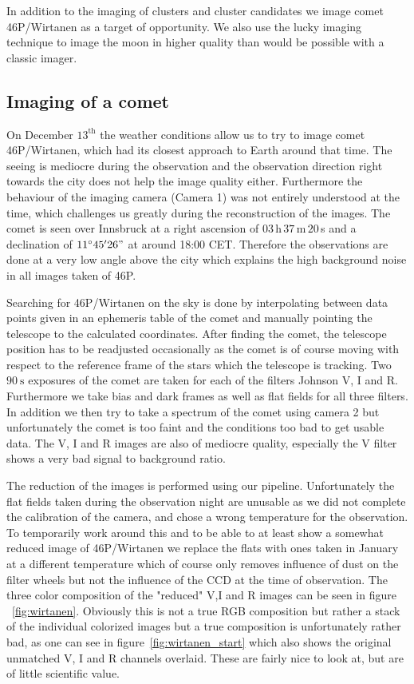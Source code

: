 \documentclass{article}
\begin{document}
In addition to the imaging of clusters and cluster candidates we image comet 46P/Wirtanen as a target of opportunity. We also use the lucky imaging technique to image the moon in higher quality than would be possible with a classic imager.

\subsection{Imaging of a comet}

On December $13^\text{th}$ the weather conditions allow us to try to image comet 46P/Wirtanen, which had its closest approach to Earth around that time. The seeing is mediocre during the observation and the observation direction right towards the city does not help the image quality either. Furthermore the behaviour of the imaging camera (Camera 1) was not entirely understood at the time, which challenges us greatly during the reconstruction of the images.
The comet is seen over Innsbruck at a right ascension of $\num{03}\,$h$\,\num{37}\,$m$\,\num{20}\,$s and a declination of $\SI{11}{\degree} \num{45}'\num{26}"$ at around 18:00 CET. Therefore the observations are done at a very low angle above the city which explains the high background noise in all images taken of 46P.

Searching for 46P/Wirtanen on the sky is done by interpolating between data points given in an ephemeris table \parencite{wirtanen} of the comet and manually pointing the telescope to the calculated coordinates. After finding the comet, the telescope position has to be readjusted occasionally as the comet is of course moving with respect to the reference frame of the stars which the telescope is tracking. Two $\SI{90}{\second}$ exposures of the comet are taken for each of the filters Johnson V, I and R. Furthermore we take bias and dark frames as well as flat fields for all three filters. In addition we then try to take a spectrum of the comet using camera 2 but unfortunately the comet is too faint and the conditions too bad to get usable data. The V, I and R images are also of mediocre quality, especially the V filter shows a very bad signal to background ratio. 

The reduction of the images is performed using our pipeline. Unfortunately the flat fields taken during the observation night are unusable as we did not complete the calibration of the camera, and chose a wrong temperature for the observation. To temporarily work around this and to be able to at least show a somewhat reduced image of 46P/Wirtanen we replace the flats with ones taken in January at a different temperature which of course only removes influence of dust on the filter wheels but not the influence of the CCD at the time of observation. The three color composition of the "reduced" V,I and R images can be seen in figure ~\ref{fig:wirtanen}. Obviously this is not a true RGB composition but rather a stack of the individual colorized images but a true composition is unfortunately rather bad, as one can see in figure~\ref{fig:wirtanen_start} which also shows the original unmatched V, I and R channels overlaid. These are fairly nice to look at, but are of little scientific value.
\end{document}
